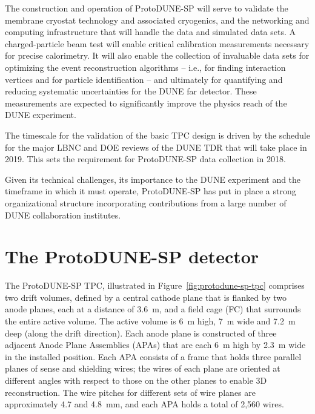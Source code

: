 The construction and operation of ProtoDUNE-SP will serve to validate the membrane cryostat technology and associated cryogenics, and the networking and computing infrastructure that will handle the data and simulated data sets.
A charged-particle beam test will enable critical calibration measurements necessary for precise calorimetry. It will also enable the collection of invaluable data sets for optimizing the event reconstruction algorithms -- i.e., for finding interaction vertices and for particle identification -- and ultimately for quantifying and reducing systematic uncertainties for the DUNE far detector. These measurements are expected to significantly improve the physics reach of the DUNE experiment.

The timescale for the validation of the basic TPC design is driven by the schedule for the major LBNC and DOE reviews of the DUNE TDR that will take place in 2019. This sets the requirement for ProtoDUNE-SP data collection in 2018. 

Given its technical challenges, its importance to the DUNE experiment and the timeframe in which it must operate, ProtoDUNE-SP has put in place a strong organizational structure incorporating 
contributions from a large number of DUNE collaboration institutes. 

\section{The ProtoDUNE-SP detector}
\label{intro:detector}

The ProtoDUNE-SP TPC, illustrated in Figure~\ref{fig:protodune-sp-tpc} comprises two drift volumes, defined by  a central cathode plane that is flanked by two anode planes, each at a distance of 3.6~m, and a field cage (FC) that surrounds the entire active volume. The active volume is 6~m high, 7~m wide and 7.2~m deep (along the drift direction).
Each anode plane is constructed of three adjacent Anode Plane Assemblies (APAs) that are each 6~m high by 2.3~m wide in the installed position. Each APA consists of a frame that holds three parallel planes of sense and shielding wires; the wires of each plane are
oriented at different angles with respect to those on the other planes to enable 3D reconstruction.  The wire pitches for %
different sets of wire planes are approximately 4.7 and 4.8~mm, and each APA holds a total of 2,560 wires. 


